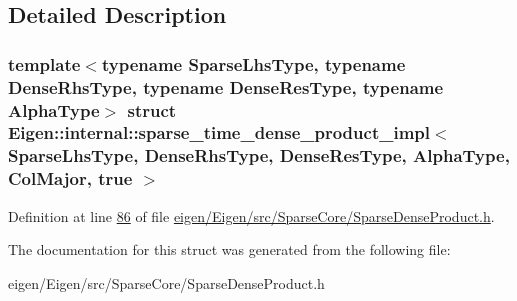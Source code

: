 \subsection{Detailed Description}
\subsubsection*{template$<$typename Sparse\+Lhs\+Type, typename Dense\+Rhs\+Type, typename Dense\+Res\+Type, typename Alpha\+Type$>$\newline
struct Eigen\+::internal\+::sparse\+\_\+time\+\_\+dense\+\_\+product\+\_\+impl$<$ Sparse\+Lhs\+Type, Dense\+Rhs\+Type, Dense\+Res\+Type, Alpha\+Type, Col\+Major, true $>$}



Definition at line \hyperlink{eigen_2_eigen_2src_2_sparse_core_2_sparse_dense_product_8h_source_l00086}{86} of file \hyperlink{eigen_2_eigen_2src_2_sparse_core_2_sparse_dense_product_8h_source}{eigen/\+Eigen/src/\+Sparse\+Core/\+Sparse\+Dense\+Product.\+h}.



The documentation for this struct was generated from the following file\+:\begin{DoxyCompactItemize}
\item 
eigen/\+Eigen/src/\+Sparse\+Core/\+Sparse\+Dense\+Product.\+h\end{DoxyCompactItemize}
